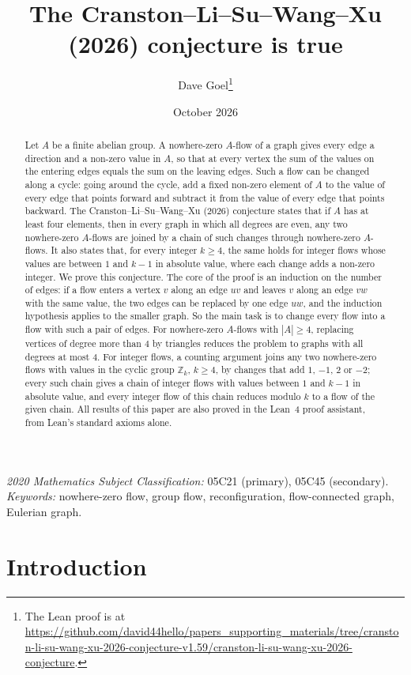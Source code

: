 \documentclass[11pt]{article}
\title{The Cranston--Li--Su--Wang--Xu (2026) conjecture is true}
\author{Dave Goel\thanks{\raggedright The Lean proof is at
\url{https://github.com/david44hello/papers_supporting_materials/tree/cranston-li-su-wang-xu-2026-conjecture-v1.59/cranston-li-su-wang-xu-2026-conjecture}.}}
\date{October 2026}
\theoremstyle{definition}
\newcommand{\Z}{\mathbb{Z}}
\begin{document}
\maketitle

\begin{abstract}
Let $A$ be a finite abelian group. A nowhere-zero $A$-flow of a graph gives every edge a direction and a non-zero
value in $A$, so that at every vertex the sum of the values on the entering edges equals the sum on the leaving edges.
Such a flow can be changed along a cycle: going around the cycle, add a fixed non-zero element of $A$ to the value of
every edge that points forward and subtract it from the value of every edge that points backward. The Cranston--Li--Su--Wang--Xu (2026) conjecture states that if $A$ has at least four elements, then in every
graph in which all degrees are even, any two nowhere-zero
$A$-flows are joined by a chain of such changes through nowhere-zero $A$-flows. It also states that, for every integer $k\ge 4$, the same holds for integer flows whose
values are between $1$ and $k-1$ in absolute value, where each change adds a non-zero integer. We prove this conjecture. The core of the proof is an induction on the number of edges: if a flow
enters a vertex $v$ along an edge $uv$ and leaves $v$ along an edge $vw$ with the same value, the two edges can be
replaced by one edge $uw$, and the induction hypothesis applies to the smaller graph. So the main task is to change
every flow into a flow with such a pair of edges.
For nowhere-zero $A$-flows with $|A|\ge 4$, replacing vertices of degree more than $4$ by triangles reduces the problem to graphs with all degrees
at most $4$. For integer flows, a counting argument joins any two nowhere-zero flows with values in the cyclic group $\Z_k$,
$k\ge 4$, by changes that add $1$, $-1$, $2$ or $-2$; every such chain gives a chain of integer flows with values between
$1$ and $k-1$ in absolute value, and every integer flow of this chain reduces modulo $k$ to a flow of the given chain. All results of this paper are also proved in the Lean~4 proof
assistant, from Lean's standard axioms alone.
\end{abstract}

\noindent\textit{2020 Mathematics Subject Classification:} 05C21 (primary), 05C45 (secondary).\\
\textit{Keywords:} nowhere-zero flow, group flow, reconfiguration, flow-connected graph, Eulerian graph.

\section{Introduction}\label{sec:intro}
\end{document}
